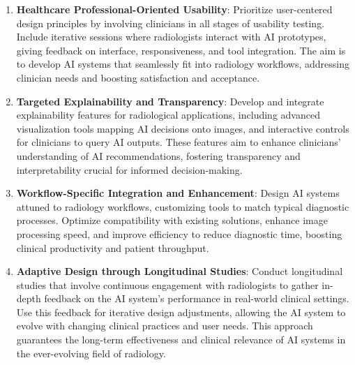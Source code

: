\begin{enumerate}

\item \textcolor{revised}{\textbf{Healthcare Professional-Oriented Usability}:
Prioritize user-centered design principles by involving clinicians in all stages of usability testing.
Include iterative sessions where radiologists interact with \ac{AI} prototypes, giving feedback on interface, responsiveness, and tool integration.
The aim is to develop \ac{AI} systems that seamlessly fit into radiology workflows, addressing clinician needs and boosting satisfaction and acceptance.}

\vspace{0.025mm}

\item \textcolor{revised}{\textbf{Targeted Explainability and Transparency}:
Develop and integrate explainability features for radiological applications, including advanced visualization tools mapping \ac{AI} decisions onto images, and interactive controls for clinicians to query \ac{AI} outputs.
These features aim to enhance clinicians' understanding of \ac{AI} recommendations, fostering transparency and interpretability crucial for informed decision-making.}

\vspace{0.025mm}

\item \textcolor{revised}{\textbf{Workflow-Specific Integration and Enhancement}:
Design \ac{AI} systems attuned to radiology workflows, customizing tools to match typical diagnostic processes.
Optimize compatibility with existing solutions, enhance image processing speed, and improve efficiency to reduce diagnostic time, boosting clinical productivity and patient throughput.}

\vspace{0.05mm}

\item \textcolor{revised}{\textbf{Adaptive Design through Longitudinal Studies}:
Conduct longitudinal studies that involve continuous engagement with radiologists to gather in-depth feedback on the \ac{AI} system's performance in real-world clinical settings.
Use this feedback for iterative design adjustments, allowing the \ac{AI} system to evolve with changing clinical practices and user needs.
This approach guarantees the long-term effectiveness and clinical relevance of \ac{AI} systems in the ever-evolving field of radiology.}

\end{enumerate}

